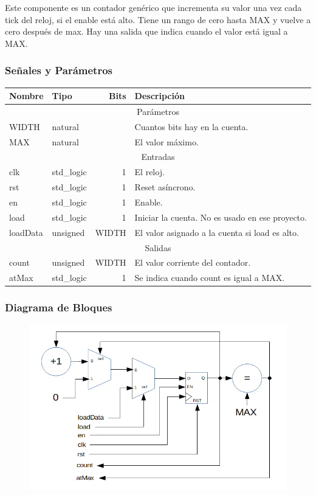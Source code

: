 \documentclass[a4paper]{article}
\begin{document}
Este componente es un contador genérico que incrementa su valor una vez cada tick del reloj, si el enable está alto. Tiene un rango de cero hasta MAX y vuelve a cero después de max. Hay una salida que indica cuando el valor está igual a MAX.

\subsubsection{Señales y Parámetros}
\begin{tabular}{| l | l | r | l |}
\hline
\textbf{Nombre} & \textbf{Tipo} & \textbf{Bits} & \textbf{Descripción} \\ \hline
\multicolumn{4}{|c|}{Parámetros} \\ \hline
WIDTH & natural & & Cuantos bits hay en la cuenta. \\
MAX & natural & & El valor máximo. \\ \hline
\multicolumn{4}{|c|}{Entradas} \\ \hline
clk & std\_logic & 1 & El reloj. \\
rst & std\_logic & 1 & Reset asíncrono. \\
en & std\_logic & 1 & Enable. \\
load & std\_logic & 1 & Iniciar la cuenta. No es usado en ese proyecto. \\
loadData & unsigned & WIDTH & El valor asignado a la cuenta si load es alto. \\ \hline
\multicolumn{4}{|c|}{Salidas} \\ \hline
count & unsigned & WIDTH & El valor corriente del contador. \\
atMax & std\_logic & 1 & Se indica cuando count es igual a MAX. \\ \hline
\end{tabular}

\subsubsection{Diagrama de Bloques}

\begin{figure}[!h]
\includegraphics[width=15cm]{img/contador_bloque.png}
\end{figure}
\end{document}
